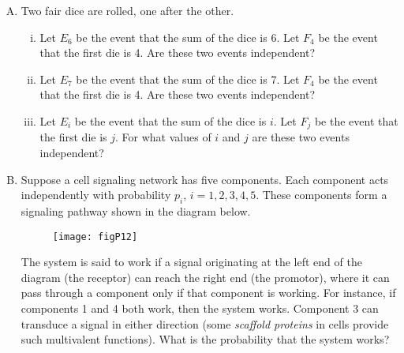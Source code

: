\documentclass[12pt,letterpaper]{article}
\begin{document}
\begin{enumerate}[A.]

\item Two fair dice are rolled, one after the other.
\begin{enumerate}[i.]
\item Let $E_{6}$ be the event that the sum of the dice is 6. Let $F_4$ be the event that the first die is 4. Are these two events independent?
\item Let $E_{7}$ be the event that the sum of the dice is 7. Let $F_4$ be the event that the first die is 4. Are these two events independent?
\item Let $E_i$ be the event that the sum of the dice is $i$. Let $F_j$ be the event that the first die is $j$. For what values of $i$ and $j$ are these two events independent?
\end{enumerate}

\item Suppose a cell signaling network has five components. 
Each component acts independently with probability $p_i$, $i=1,2,3,4,5$. 
These components form a signaling pathway shown in the diagram below.
\begin{figure}[h!]
\centering\texttt{[image: figP12]}
\end{figure}
The system is said to work if a signal originating at the left end of the diagram (the receptor) can reach the right end (the promotor), where it can pass through a component only if that component is working. 
For instance, if components 1 and 4 both work, then the system works. Component 3 can transduce a signal in either direction (some \emph{scaffold proteins} in cells provide such multivalent functions). 
What is the probability that the system works?

\end{enumerate}
\end{document}
